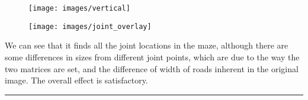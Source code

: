 \documentclass[conference]{styles/acmsiggraph}
\newenvironment{answer}{}{}
\begin{document}
\begin{answer}
		\begin{figure}[H]
			\centering
			\texttt{[image: images/vertical]}
			\end{figure}	
	
		\begin{figure}[H]
			\centering
			\texttt{[image: images/joint\_overlay]}
			\end{figure}	
			
			We can see that it finds all the joint locations in the maze, although there are some differences in sizes from different joint points, which are due to the way the two matrices are set, and the difference of width of roads inherent in the original image. The overall effect is satisfactory.

		\rule{\textwidth}{0.4pt}
		\end{answer}
			
			
	
\end{document}
